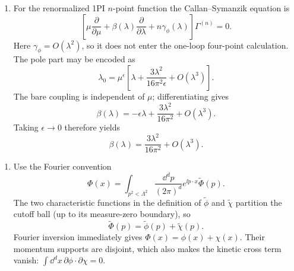 \begin{enumerate}
\begin{enumerate}
Choose \(\mu=M\).  Since
\(\int_0^1\dd x\,[-\ln(x(1-x))]=2\), a momentum-subtraction counterterm that
enforces \(\lambda_{\mathrm{eff}}(M)=\lambda\) is
\[
 \boxed{\;
 \delta\lambda_{\mathrm{MOM}}
 =\frac{3\lambda^2}{32\pi^2}
 \left(\frac2\epsilon-\gamma+\ln(4\pi)+2\right).
 \;}
\]
The \(\overline{\mathrm{MS}}\) choice instead removes only
\[
 \delta\lambda_{\overline{\mathrm{MS}}}
 =\frac{3\lambda^2}{16\pi^2}\frac1{\bar\epsilon},
 \qquad
 \frac1{\bar\epsilon}
 =\frac1\epsilon-\frac\gamma2+\frac12\ln(4\pi),
\]
and therefore differs by a finite redefinition of the coupling.

\item
For the renormalized 1PI \(n\)-point function the Callan--Symanzik equation
is
\[
 \left[\mu\frac{\partial}{\partial\mu}
 +\beta(\lambda)\frac{\partial}{\partial\lambda}
 +n\gamma_\phi(\lambda)\right]\Gamma^{(n)}=0.
\]
Here \(\gamma_\phi=O(\lambda^2)\), so it does not enter the one-loop
four-point calculation.  The pole part may be encoded as
\[
 \lambda_0=\mu^\epsilon\left[
 \lambda+\frac{3\lambda^2}{16\pi^2\epsilon}
 +O(\lambda^3)\right].
\]
The bare coupling is independent of \(\mu\); differentiating gives
\[
 \beta(\lambda)=-\epsilon\lambda
 +\frac{3\lambda^2}{16\pi^2}+O(\lambda^3).
\]
Taking \(\epsilon\to0\) therefore yields
\[
 \boxed{\beta(\lambda)=\frac{3\lambda^2}{16\pi^2}
 +O(\lambda^3).}
\]
\end{enumerate}

\begin{enumerate}
\item
Use the Fourier convention
\[
 \Phi(x)=\int_{p^2<\Lambda^2}\frac{\dd^dp}{(2\pi)^d}
 e^{\ii p\cdot x}\widetilde\Phi(p).
\]
The two characteristic functions in the definition of
\(\widetilde\phi\) and \(\widetilde\chi\) partition the cutoff ball (up to
its measure-zero boundary), so
\[
 \widetilde\Phi(p)=\widetilde\phi(p)+\widetilde\chi(p).
\]
Fourier inversion immediately gives
\(\Phi(x)=\phi(x)+\chi(x)\).  Their momentum supports are disjoint, which
also makes the kinetic cross term vanish:
\(\int \dd^dx\,\partial\phi\cdot\partial\chi=0\).


\end{enumerate}
\end{enumerate}
